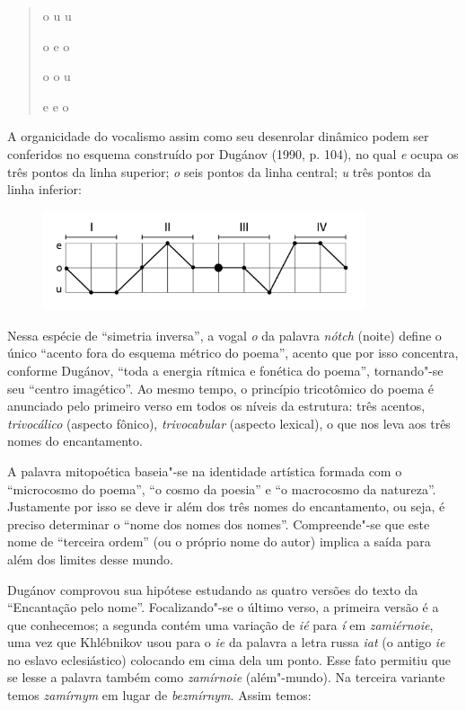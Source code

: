 \begin{verse}
o u u

o e o

o o u

e e o
\end{verse}

A organicidade do vocalismo assim como seu desenrolar dinâmico podem ser
conferidos no esquema construído por Dugánov (1990, p. 104), no qual
\emph{e} ocupa os três pontos da linha superior; \emph{o} seis pontos da
linha central; \emph{u} três pontos da linha inferior:

\begin{figure}[!ht]
\centering
  \includegraphics[width=95mm]{./imgs/grafico3.jpg}
\end{figure}

Nessa espécie de ``simetria inversa'', a vogal \emph{o} da palavra
\emph{nótch} (noite) define o único ``acento fora do esquema métrico
do poema'', acento que por isso concentra, conforme
Dugánov, ``toda a energia rítmica e fonética do poema'',
tornando"-se seu ``centro imagético''. Ao mesmo tempo, o princípio
tricotômico do poema é anunciado pelo primeiro verso em todos os níveis
da estrutura: três acentos, \emph{trivocálico} (aspecto fônico),
\emph{trivocabular} (aspecto lexical), o que nos leva aos três nomes do
encantamento.

A palavra mitopoética baseia"-se na identidade artística formada com o
``microcosmo do poema'', ``o cosmo da poesia'' e ``o macrocosmo da natureza''.
Justamente por isso se deve ir além dos três nomes do encantamento, ou seja, é preciso determinar
o ``nome dos nomes dos nomes''. Compreende"-se que este nome de ``terceira ordem'' (ou o próprio nome do autor)
implica a saída para além dos limites desse mundo.

Dugánov comprovou sua hipótese estudando as quatro versões do texto da
``Encantação pelo nome''. Focalizando"-se o último verso, a primeira versão é a que conhecemos; a segunda
contém uma variação de \emph{ié} para \emph{í} em \emph{zamiérnoie}, uma vez
que Khlébnikov usou para o \emph{ie} da palavra a letra
russa \emph{iat} (o antigo \emph{ie} no eslavo eclesiástico)
colocando em cima dela um ponto. Esse fato permitiu que se lesse a
palavra também como \emph{zamírnoie} (além"-mundo). Na terceira
variante temos \emph{zamírnym} em lugar de \emph{bezmírnym}.
Assim temos:

